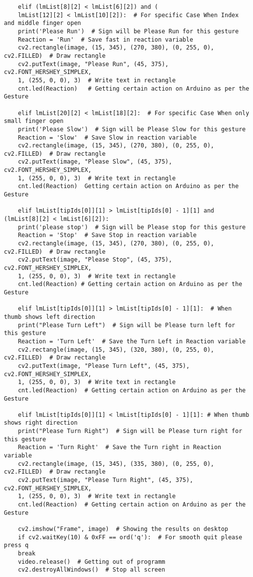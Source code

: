 \begin{verbatim}
	elif (lmList[8][2] < lmList[6][2]) and (
	lmList[12][2] < lmList[10][2]):  # For specific Case When Index and middle finger open
	print('Please Run')  # Sign will be Please Run for this gesture
	Reaction = 'Run'  # Save fast in reaction variable
	cv2.rectangle(image, (15, 345), (270, 380), (0, 255, 0), cv2.FILLED)  # Draw rectangle 
	cv2.putText(image, "Please Run", (45, 375), cv2.FONT_HERSHEY_SIMPLEX,
	1, (255, 0, 0), 3)  # Write text in rectangle
	cnt.led(Reaction)   # Getting certain action on Arduino as per the Gesture
	
	elif lmList[20][2] < lmList[18][2]:  # For specific Case When only small finger open
	print('Please Slow')  # Sign will be Please Slow for this gesture
	Reaction = 'Slow'  # Save Slow in reaction variable
	cv2.rectangle(image, (15, 345), (270, 380), (0, 255, 0), cv2.FILLED)  # Draw rectangle 
	cv2.putText(image, "Please Slow", (45, 375), cv2.FONT_HERSHEY_SIMPLEX,
	1, (255, 0, 0), 3)  # Write text in rectangle
	cnt.led(Reaction)  Getting certain action on Arduino as per the Gesture
	
	elif lmList[tipIds[0]][1] > lmList[tipIds[0] - 1][1] and (lmList[8][2] < lmList[6][2]):
	print('please stop')  # Sign will be Please stop for this gesture
	Reaction = 'Stop'  # Save Stop in reaction variable
	cv2.rectangle(image, (15, 345), (270, 380), (0, 255, 0), cv2.FILLED)  # Draw rectangle
	cv2.putText(image, "Please Stop", (45, 375), cv2.FONT_HERSHEY_SIMPLEX,
	1, (255, 0, 0), 3)  # Write text in rectangle
	cnt.led(Reaction) # Getting certain action on Arduino as per the Gesture
	
	elif lmList[tipIds[0]][1] > lmList[tipIds[0] - 1][1]:  # When thumb shows left direction
	print("Please Turn Left")  # Sign will be Please turn left for this gesture
	Reaction = 'Turn Left'  # Save the Turn Left in Reaction variable
	cv2.rectangle(image, (15, 345), (320, 380), (0, 255, 0), cv2.FILLED)  # Draw rectangle 
	cv2.putText(image, "Please Turn Left", (45, 375), cv2.FONT_HERSHEY_SIMPLEX,
	1, (255, 0, 0), 3)  # Write text in rectangle
	cnt.led(Reaction)  # Getting certain action on Arduino as per the Gesture
	
	elif lmList[tipIds[0]][1] < lmList[tipIds[0] - 1][1]: # When thumb shows right direction
	print("Please Turn Right")  # Sign will be Please turn right for this gesture
	Reaction = 'Turn Right'  # Save the Turn right in Reaction variable
	cv2.rectangle(image, (15, 345), (335, 380), (0, 255, 0), cv2.FILLED)  # Draw rectangle 
	cv2.putText(image, "Please Turn Right", (45, 375), cv2.FONT_HERSHEY_SIMPLEX,
	1, (255, 0, 0), 3)  # Write text in rectangle
	cnt.led(Reaction)  # Getting certain action on Arduino as per the Gesture
	
	cv2.imshow("Frame", image)  # Showing the results on desktop
	if cv2.waitKey(10) & 0xFF == ord('q'):  # For smooth quit please press q
	break
	video.release()  # Getting out of programm
	cv2.destroyAllWindows()  # Stop all screen
	
\end{verbatim}

